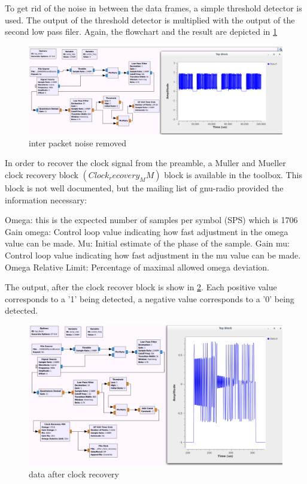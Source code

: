  
To get rid of the noise in between the data frames, a simple threshold detector is used. The output of the threshold detector is multiplied with the output of the second low pass filer. Again, the flowchart and the result are depicted in \ref{fig:pijnacker_q_dem_improved}
 
 \begin{figure}[h]
\centering
\includegraphics[width=1\linewidth]{figures/pijnacker_q_dem_improved}
\caption[pijnacker_q_dem_improved]{inter packet noise removed}
\label{fig:pijnacker_q_dem_improved}
\end{figure}

In order to recover the clock signal from the preamble, a Muller and Mueller clock recovery block $(Clock_recovery_MM)$ block is available in the toolbox. This block is not well documented, but the mailing list of gnu-radio provided the information necessary: \cite{GNU_MAILING_CLOCK_REC}

Omega: this is the expected number of samples per symbol (SPS) which is 1706
Gain omega: Control loop value indicating how fast adjustment in the omega value can be made. 
Mu: Initial estimate of the phase of the sample.
Gain mu: Control loop value indicating how fast adjustment in the mu value can be made. 
Omega Relative Limit: Percentage of maximal allowed omega deviation.

The output, after the clock recover block is show in \ref{fig:after_clock_rec}. Each positive value corresponds to a '1' being detected, a negative value corresponds to a '0' being detected. 

\begin{figure}[h]
\centering
\includegraphics[width=1\linewidth]{figures/after_clock_rec}
\caption[Output after clock recovery]{data after clock recovery }
\label{fig:after_clock_rec}
\end{figure}


